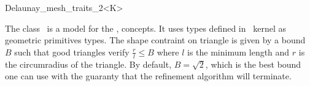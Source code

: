 \begin{ccRefClass}{Delaunay_mesh_traits_2<K>}

\ccDefinition
  
The class \ccRefName\ is a model for the ,
concepts. It uses types defined in \cgal\ kernel as geometric
primitives types. The shape contraint on triangle is given by a bound
$B$ such that good triangles verify $\frac{r}{l} \le B$ where $l$ is
the minimum length and $r$ is the circumradius of the triangle. By default,
$B=\sqrt{2}$, which is the best bound one can use with the guaranty that the
refinement algorithm will terminate.


\ccIsModel


\ccCreation
{}
\end{ccRefClass}

